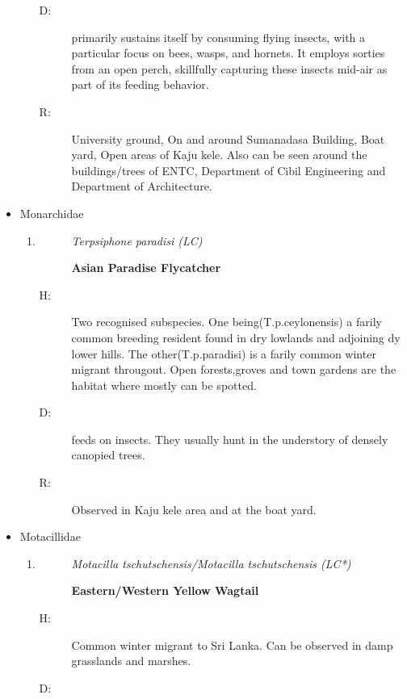 \begin{itemize}
\begin{enumerate}
\begin{description}
\item[D: ]%
primarily sustains itself by consuming flying insects, with a particular focus on bees, wasps, and hornets. It employs sorties from an open perch, skillfully capturing these insects mid{-}air as part of its feeding behavior.%
\item[R: ]%
University ground, On and around Sumanadasa Building, Boat yard, Open areas of Kaju kele. Also can be seen around the buildings/trees of  ENTC, Department of Cibil Engineering and Department of Architecture.%
\end{description}%
\end{enumerate}%
\item%
Monarchidae%
\begin{enumerate}%
\item%
\begin{description}%
\item[]%
\textit{Terpsiphone paradisi (LC)}%
\item[]%
\textbf{Asian Paradise Flycatcher}%
\end{description}%
\begin{description}%
\item[H: ]%
Two recognised subspecies. One being(T.p.ceylonensis) a farily common breeding resident found in dry lowlands and adjoining dy lower hills. The other(T.p.paradisi) is a farily common winter migrant througout. Open forests,groves and town gardens are the habitat where mostly can be spotted.%
\item[D: ]%
feeds on insects.  They usually hunt in the understory of densely canopied trees.%
\item[R: ]%
Observed in Kaju kele area and at the boat yard.%
\end{description}%
\end{enumerate}%
\item%
Motacillidae%
\begin{enumerate}%
\item%
\begin{description}%
\item[]%
\textit{Motacilla tschutschensis/Motacilla tschutschensis (LC*)}%
\item[]%
\textbf{Eastern/Western Yellow Wagtail}%
\end{description}%
\begin{description}%
\item[H: ]%
Common winter migrant to Sri Lanka. Can be observed in damp grasslands and marshes.%
\item[D: ]%

\end{description}
\end{enumerate}
\end{itemize}
